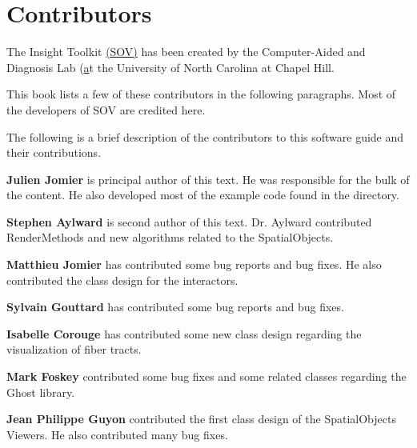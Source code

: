 \chapter*{Contributors}
\noindent

The Insight Toolkit \href{http://caddlab.rad.unc.edu/software/SOViewer}{(SOV)} has been created by
the Computer-Aided and Diagnosis Lab (\href{http://caddlab.rad.unc.edu} at the University
of North Carolina at Chapel Hill.

This book lists a few of these contributors in the following paragraphs. Most of the
developers of SOV are credited here.

The following is a brief description of the contributors to this software
guide and their contributions.

{\bf Julien Jomier} is principal author of this text.
He was responsible for the bulk of  the content. 
He also developed most of the example code found in the
 directory.

{\bf Stephen Aylward} is second author of this text.
Dr. Aylward contributed RenderMethods and new algorithms related to the SpatialObjects.

{\bf Matthieu Jomier} has contributed some bug reports and bug fixes.
He also contributed the class design for the interactors.

{\bf Sylvain Gouttard} has contributed some bug reports and bug fixes.

{\bf Isabelle Corouge} has contributed some new class design regarding the visualization of
fiber tracts.

{\bf Mark Foskey} contributed some bug fixes and some related classes regarding the 
Ghost library.

{\bf Jean Philippe Guyon} contributed the first class design of the SpatialObjects Viewers.
He also contributed many bug fixes.


